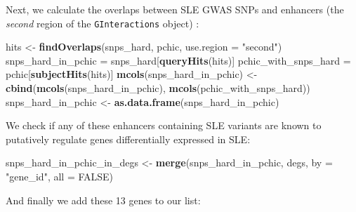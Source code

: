\documentclass[9pt,a4paper,]{extarticle}
\newenvironment{Shaded}{\begin{snugshade}}{\end{snugshade}}
\newcommand{\KeywordTok}[1]{\textcolor[rgb]{0.13,0.29,0.53}{\textbf{#1}}}
\newcommand{\DataTypeTok}[1]{\textcolor[rgb]{0.13,0.29,0.53}{#1}}
\newcommand{\DecValTok}[1]{\textcolor[rgb]{0.00,0.00,0.81}{#1}}
\newcommand{\StringTok}[1]{\textcolor[rgb]{0.31,0.60,0.02}{#1}}
\newcommand{\OtherTok}[1]{\textcolor[rgb]{0.56,0.35,0.01}{#1}}
\newcommand{\OperatorTok}[1]{\textcolor[rgb]{0.81,0.36,0.00}{\textbf{#1}}}
\newcommand{\NormalTok}[1]{#1}
\theoremstyle{definition}
\theoremstyle{definition}
\theoremstyle{definition}
\theoremstyle{remark}
\begin{document}
\begin{Shaded}
\end{Shaded}

Next, we calculate the overlaps between SLE GWAS SNPs and enhancers (the \emph{second} region of the \texttt{GInteractions} object) :

\begin{Shaded}
\begin{Highlighting}[]
\NormalTok{hits <-}\StringTok{ }\KeywordTok{findOverlaps}\NormalTok{(snps_hard, pchic, }\DataTypeTok{use.region =} \StringTok{"second"}\NormalTok{)}
\NormalTok{snps_hard_in_pchic =}\StringTok{ }\NormalTok{snps_hard[}\KeywordTok{queryHits}\NormalTok{(hits)]}
\NormalTok{pchic_with_snps_hard =}\StringTok{ }\NormalTok{pchic[}\KeywordTok{subjectHits}\NormalTok{(hits)]}
\KeywordTok{mcols}\NormalTok{(snps_hard_in_pchic) <-}\StringTok{ }\KeywordTok{cbind}\NormalTok{(}\KeywordTok{mcols}\NormalTok{(snps_hard_in_pchic), }\KeywordTok{mcols}\NormalTok{(pchic_with_snps_hard))}
\NormalTok{snps_hard_in_pchic <-}\StringTok{ }\KeywordTok{as.data.frame}\NormalTok{(snps_hard_in_pchic)}
\end{Highlighting}
\end{Shaded}

We check if any of these enhancers containing SLE variants are known to putatively regulate genes differentially expressed in SLE:

\begin{Shaded}
\begin{Highlighting}[]
\NormalTok{snps_hard_in_pchic_in_degs <-}\StringTok{ }\KeywordTok{merge}\NormalTok{(snps_hard_in_pchic, degs, }\DataTypeTok{by =} \StringTok{"gene_id"}\NormalTok{, }\DataTypeTok{all =} \OtherTok{FALSE}\NormalTok{)}
\end{Highlighting}
\end{Shaded}

And finally we add these 13 genes to our list:
\end{document}
